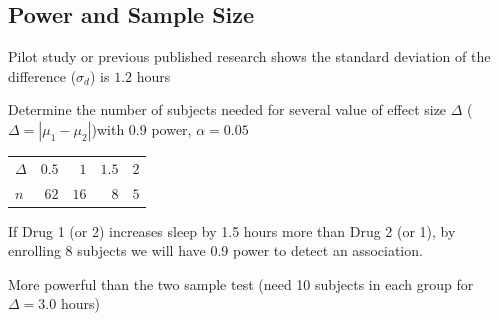 \subsection{Power and Sample Size}

\bi
\item Pilot study or previous published research shows the standard deviation of the difference ($\sigma_d$) is $1.2$ hours
\item Determine the number of subjects needed for several value of effect size $\Delta$ ($\Delta = |\mu_1 - \mu_2|$)with 0.9 power, $\alpha = 0.05$
\ei

\begin{table}[!hbp]
 \begin{center}
 \begin{tabular}{lrrrr}\hline\hline
$\Delta$ &$ 0.5$&$ 1$&$1.5$&$2$\\
$n$ &$62$&$16$&$8$&$5$\\
\hline
\end{tabular}
\end{center}
\end{table}

\bi
\item If Drug 1 (or 2) increases sleep by 1.5 hours more than Drug 2 (or 1), by enrolling 8 subjects we will have 0.9 power to detect an association.
\item More powerful than the two sample test (need 10 subjects in each group for $\Delta = 3.0$ hours)
\ei
